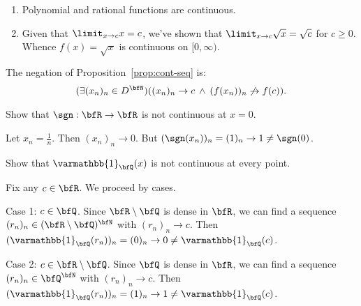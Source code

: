     \begin{example}
        \phantom{a}
        \begin{enumerate}[label = (\arabic*)]
            \item Polynomial and rational functions are continuous.
            \item Given that $\limit_{x \rightarrow c}x = c$, we've shown that $\limit_{x \rightarrow c}\sqrt{x} = \sqrt{c}$ for $c \geq 0$. Whence $f(x) = \sqrt{x}$ is continuous on $[0,\infty)$.
        \end{enumerate}
    \end{example}

    \begin{note}
        The negation of Proposition~\ref{prop:cont-seq} is:
            \begin{equation*}
            \begin{split}
                (\exists (x_n)_n \in D^\bfN)((x_n)_n \rightarrow c \hspace{2pt}\land \hspace{2pt} (f(x_n))_n \not\rightarrow f(c)).
            \end{split}
            \end{equation*}
    \end{note}

    \begin{example}
        Show that $\sgn : \bfR \rightarrow \bfR$ is not continuous at $x = 0$.
    \end{example}
        \begin{solution}
            Let $x_n = \frac{1}{n}$. Then $(x_n)_n \rightarrow 0$. But $(\sgn(x_n))_n = (1)_n \rightarrow 1 \neq \sgn(0)$.
        \end{solution}

    \begin{example}
        Show that $\varmathbb{1}_\bfQ(x)$ is not continuous at every point.
    \end{example}
        \begin{solution}
            Fix any $c \in \bfR$. We proceed by cases. \nl 

            Case 1: $c \in \bfQ$. Since $\bfR\setminus \bfQ$ is dense in $\bfR$, we can find a sequence $(r_n)_n \in (\bfR \setminus \bfQ)^\bfN$ with $(r_n)_n \rightarrow c$. Then $(\varmathbb{1}_\bfQ(r_n))_n = (0)_n \rightarrow 0 \neq \varmathbb{1}_\bfQ(c)$. \nl 

            Case 2: $c \in \bfR\setminus \bfQ$. Since $\bfQ$ is dense in $\bfR$, we can find a sequence $(r_n)_n \in \bfQ^\bfN$ with $(r_n)_n \rightarrow c$. Then $(\varmathbb{1}_\bfQ(r_n))_n = (1)_n \rightarrow 1 \neq \varmathbb{1}_\bfQ(c)$.
        \end{solution}


